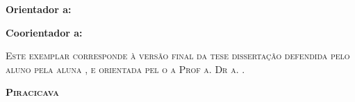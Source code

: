 \noindent
\textbf{Orientador\ifx\femaleOrientador\undefined
	\else
	a\fi: \orientador
}
\vspace{.25cm}

\ifx\coorientador\undefined
\else
\noindent
\textbf{Coorientador\ifx\femaleCoorientador\undefined
	\else
	a\fi: \coorientador
}
\vspace{.5cm}
\fi

\noindent
\begin{minipage}[c]{.5\textwidth}
	{\footnotesize\textsc{Este exemplar corresponde à versão final da
			\ifx\mestrado\undefined
			tese
			\else
			dissertação
			\fi
			defendida
			\ifx\femaleAuthor\undefined
			pelo aluno
			\else
			pela aluna
			\fi
			\autor,
			e orientada pel\ifx\femaleOrientador\undefined
			o\else
			a\fi{} Prof\ifx\femaleOrientador\undefined
			\else
			a\fi. Dr\ifx\femaleOrientador\undefined
			\else
			a\fi. \orientador.
		}}
	\end{minipage}
	\vspace{1cm}
	
	\noindent
	
	\vspace{.5cm}
	
	
	\vfill
	\begin{center}
		{\small\textbf{\textsc{ Piracicava \\ \ano}}}
	\end{center}


\clearpage





